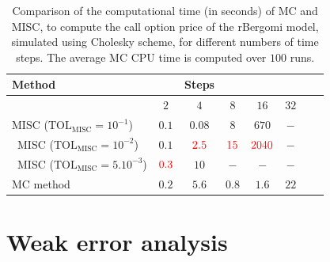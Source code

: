 \documentclass[11pt]{article}
\begin{document}
\begin{table}[htbp]
	\centering
	\begin{tabular}{l*{6}{c}r}
		\toprule[1.5pt]
	Method & & Steps  & &  &    \\
	\hline
	        & $2$ & $4$ & $8$  &$16$  &$32$ \\
		\hline
		MISC ($\text{TOL}_{\text{MISC}}=10^{-1}$)  & $0.1$ & $0.08$ & $8$  & $670$  &  $-$\\\
		MISC ($\text{TOL}_{\text{MISC}}=10^{-2}$)  & $0.1$ & ${\color{red}2.5}$ & ${\color{red}15}$ &  ${\color{red}2040}$ &  $-$\\\
				MISC ($\text{TOL}_{\text{MISC}}=5.10^{-3}$)  & ${\color{red}0.3}$& $10$ & $-$ &  $-$ &  $-$\\
		\hline	
		MC method & $0.2$  & $5.6$  & $0.8$ & $1.6$  & $22$\\
		\bottomrule[1.25pt]	
		\hline
	\end{tabular}
	\caption{Comparison of the computational time (in seconds) of  MC and MISC, to compute the call option price of the rBergomi model, simulated using Cholesky scheme, for different numbers of time steps. The average MC CPU time is computed over $100$ runs.}
	\label{Comparsion of the computational time of  MC and MISC, used to compute Call option price of rBergomi model_cholesky for different number of time steps. Case $K=1, H=0.07$, linear}
\end{table}
\FloatBarrier
\section{Weak error analysis}\label{sec:Weak error analysis}




 







 

 

 
 
 
\end{document}

